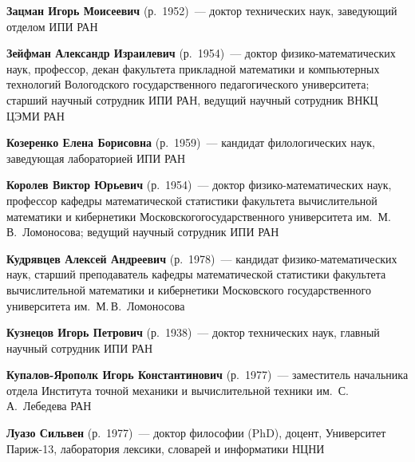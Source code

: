 \begin{multicols}{2}
\noindent
\textbf{Зацман Игорь Моисеевич} (р.\ 1952)~--- доктор технических наук, заведующий отделом 
ИПИ РАН

\vspace*{4pt}

\noindent
\textbf{Зейфман Александр Израилевич} (р.\ 1954)~--- доктор фи\-зи\-ко-ма\-те\-ма\-ти\-че\-ских 
наук, профессор, декан факультета прикладной математики и компьютерных технологий Вологодского 
государственного педагогического университета; старший научный сотрудник ИПИ РАН, ведущий 
научный сотрудник ВНКЦ ЦЭМИ РАН

\vspace*{4pt}




\noindent
\textbf{Козеренко Елена Борисовна} (р.\ 1959)~--- кандидат филологических наук, 
заведующая лабораторией ИПИ РАН

\vspace*{4pt}

\noindent
\textbf{Королев Виктор Юрьевич} (р.\ 1954)~--- доктор фи\-зи\-ко-ма\-те\-ма\-ти\-че\-ских наук, 
профессор кафедры математической статистики факультета вычислительной математики и кибернетики 
Московского\linebreak государственного университета им.\ М.\,В.~Ломоносова; ведущий научный сотрудник ИПИ РАН

\vspace*{4pt}

\noindent
\textbf{Кудрявцев Алексей Андреевич} (р.\ 1978)~--- кандидат фи\-зи\-ко-ма\-те\-ма\-ти\-че\-ских наук, 
старший преподаватель кафедры математической статистики факультета вычислительной математики и 
кибернетики Московского государственного университета им.\ М.\,В.~Ломоносова 

\vspace*{4pt}

\noindent
\textbf{Кузнецов Игорь Петрович} (р.\ 1938)~--- доктор технических наук, главный 
научный сотрудник ИПИ РАН

\vspace*{4pt}

\noindent
\textbf{Купалов-Ярополк Игорь Константинович} (р.\ 1977)~--- заместитель начальника отдела 
Института точной механики и вычислительной техники им.\ С.\,А.~Лебедева РАН

\vspace*{4pt}

\noindent
\textbf{Луазо Сильвен} (р.\ 1977)~--- доктор философии  (PhD), доцент, Университет Париж-13, 
лаборатория лексики, словарей и информатики НЦНИ


\end{multicols}
